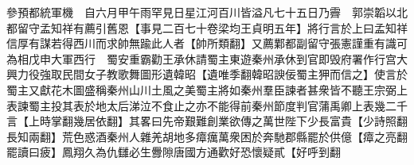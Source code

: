 參預都統軍機　自六月甲午雨罕見日星江河百川皆溢凡七十五日乃霽　郭崇韜以北都留守孟知祥有薦引舊恩【事見二百七十卷梁均王貞明五年】將行言於上曰孟知祥信厚有謀若得西川而求帥無踰此人者【帥所類翻】又薦鄴都副留守張憲謹重有識可為相戊申大軍西行　蜀安重霸勸王承休請蜀主東遊秦州承休到官即毁府署作行宫大興力役強取民間女子教歌舞圖形遺韓昭【遺唯季翻韓昭諛佞蜀主狎而信之】使言於蜀主又獻花木圖盛稱秦州山川土風之美蜀主將如秦州羣臣諫者甚衆皆不聽王宗弼上表諫蜀主投其表於地太后涕泣不食止之亦不能得前秦州節度判官蒲禹卿上表幾二千言【上時掌翻幾居依翻】其畧曰先帝艱難創業欲傳之萬世陛下少長富貴【少詩照翻長知兩翻】荒色惑酒秦州人雜羌胡地多瘴癘萬衆困於奔馳郡縣罷於供億【瘴之亮翻罷讀曰疲】鳳翔久為仇讎必生釁隙唐國方通歡好恐懷疑貳【好呼到翻